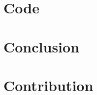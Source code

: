 \documentclass{article}
\begin{document}
\section{Code}
\label{sec:code}

\section{Conclusion}
\label{sec:conclusion}

\section{Contribution}
\label{sec:contribution}
\end{document}
